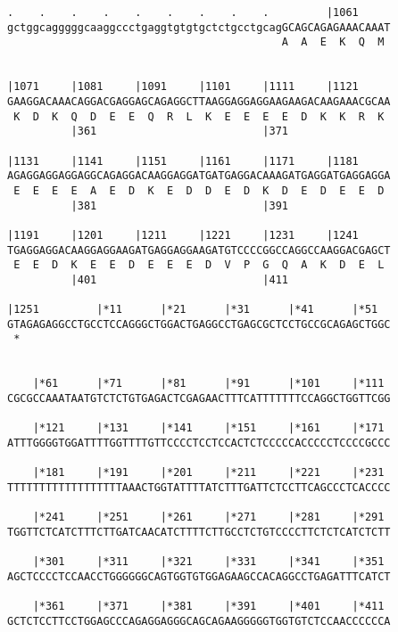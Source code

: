 \documentclass{article}
\begin{document}
\begin{Verbatim}
.    .    .    .    .    .    .    .    .         |1061     
gctggcagggggcaaggccctgaggtgtgtgctctgcctgcagGCAGCAGAGAAACAAAT
                                           A  A  E  K  Q  M 
                                                            
  
|1071     |1081     |1091     |1101     |1111     |1121     
GAAGGACAAACAGGACGAGGAGCAGAGGCTTAAGGAGGAGGAAGAAGACAAGAAACGCAA
 K  D  K  Q  D  E  E  Q  R  L  K  E  E  E  E  D  K  K  R  K 
          |361                          |371                
  
|1131     |1141     |1151     |1161     |1171     |1181     
AGAGGAGGAGGAGGCAGAGGACAAGGAGGATGATGAGGACAAAGATGAGGATGAGGAGGA
 E  E  E  E  A  E  D  K  E  D  D  E  D  K  D  E  D  E  E  D 
          |381                          |391                
  
|1191     |1201     |1211     |1221     |1231     |1241     
TGAGGAGGACAAGGAGGAAGATGAGGAGGAAGATGTCCCCGGCCAGGCCAAGGACGAGCT
 E  E  D  K  E  E  D  E  E  E  D  V  P  G  Q  A  K  D  E  L 
          |401                          |411                
  
|1251         |*11      |*21      |*31      |*41      |*51  
GTAGAGAGGCCTGCCTCCAGGGCTGGACTGAGGCCTGAGCGCTCCTGCCGCAGAGCTGGC
 *   
                                                            
  
    |*61      |*71      |*81      |*91      |*101     |*111 
CGCGCCAAATAATGTCTCTGTGAGACTCGAGAACTTTCATTTTTTTCCAGGCTGGTTCGG
                                                            
    |*121     |*131     |*141     |*151     |*161     |*171 
ATTTGGGGTGGATTTTGGTTTTGTTCCCCTCCTCCACTCTCCCCCACCCCCTCCCCGCCC
                                                            
    |*181     |*191     |*201     |*211     |*221     |*231 
TTTTTTTTTTTTTTTTTTAAACTGGTATTTTATCTTTGATTCTCCTTCAGCCCTCACCCC
                                                            
    |*241     |*251     |*261     |*271     |*281     |*291 
TGGTTCTCATCTTTCTTGATCAACATCTTTTCTTGCCTCTGTCCCCTTCTCTCATCTCTT
                                                            
    |*301     |*311     |*321     |*331     |*341     |*351 
AGCTCCCCTCCAACCTGGGGGGCAGTGGTGTGGAGAAGCCACAGGCCTGAGATTTCATCT
                                                            
    |*361     |*371     |*381     |*391     |*401     |*411 
GCTCTCCTTCCTGGAGCCCAGAGGAGGGCAGCAGAAGGGGGTGGTGTCTCCAACCCCCCA
                                                            

\end{Verbatim}
\end{document}
